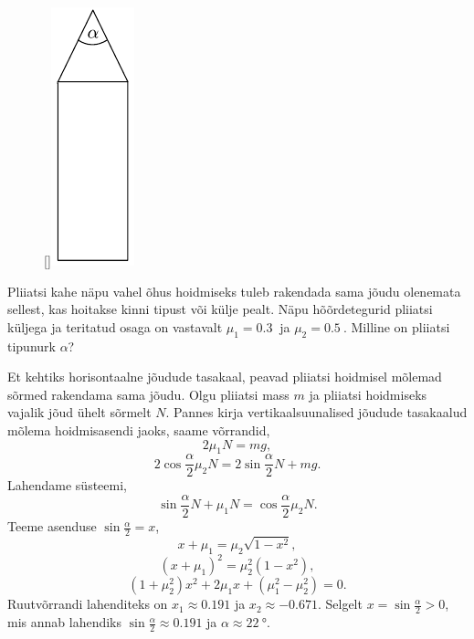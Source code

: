 
\begin{figure}
\raisebox{3pt}[\dimexpr{}\baselineskip\relax]{\includegraphics[scale=0.95]{2022-lahg-02-yl.pdf}}
\vspace{-55pt}
\end{figure}
Pliiatsi kahe näpu vahel õhus hoidmiseks tuleb rakendada sama jõudu olenemata sellest, kas hoitakse kinni tipust või külje pealt. Näpu hõõrdetegurid pliiatsi küljega ja teritatud osaga on vastavalt $\mu_1 = \SI{0,3}{}$ ja $\mu_2 = \SI{0,5}{}$. Milline on pliiatsi tipunurk $\alpha$?



\hint

\solu
Et kehtiks horisontaalne jõudude tasakaal, peavad pliiatsi hoidmisel mõlemad sõrmed rakendama sama jõudu. Olgu pliiatsi mass $m$ ja pliiatsi hoidmiseks vajalik jõud ühelt sõrmelt $N$. Pannes kirja vertikaalsuunalised jõudude tasakaalud mõlema hoidmisasendi jaoks, saame võrrandid,
\[2\mu_1 N = mg ,\]
\[2 \cos\frac{\alpha}{2}\mu_2N= 2\sin\frac{\alpha}{2}N + mg .\]
Lahendame süsteemi,
\[\sin\frac{\alpha}{2} N + \mu_1 N = \cos\frac{\alpha}{2}\mu_2 N .\]
Teeme asenduse $\sin{\frac{\alpha}{2}} = x$,
\[x + \mu_1 = \mu_2 \sqrt{1-x^2},\]
\[(x + \mu_1)^2 = \mu_2^2(1-x^2),\]
\[(1+\mu_2^2) x^2 + 2\mu_1 x + (\mu_1^2 - \mu_2^2) = 0.\]
Ruutvõrrandi lahenditeks on $x_1 \approx 0.191$ ja $x_2 \approx -0.671$. Selgelt  $x=\sin\frac{\alpha}{2} > 0$, mis annab lahendiks $\sin\frac{\alpha}{2} \approx 0.191$ ja $\alpha \approx \SI{22}{\degree}$.
\probend